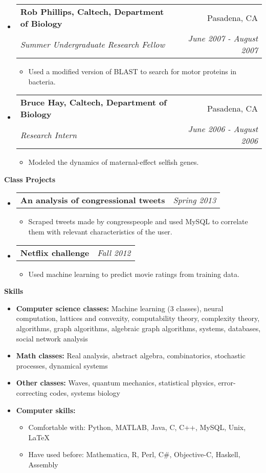 \documentclass[letterpaper,11pt]{article}
\makeatletter
\newcommand{\resitem}[1]{\item #1 \vspace{-2pt}}
\newcommand{\resheading}[1]{{\large \colorbox{mygrey}{\begin{minipage}{\textwidth}{\textbf{#1 \vphantom{p\^{E}}}}\end{minipage}}}}
\newcommand{\ressubheadingnoloc}[4]{
\begin{tabular*}{7.0in}{l@{\extracolsep{\fill}}r}
		\textbf{#1} & \textit{#4} \\
\end{tabular*}\vspace{-6pt}}
\newcommand{\ressubheading}[4]{
\begin{tabular*}{7.0in}{l@{\extracolsep{\fill}}r}
		\textbf{#1} & #2 \\
		\textit{#3} & \textit{#4}\\
\end{tabular*}\vspace{-6pt}}
\makeatother
\begin{document}
\begin{itemize}
\item
	\ressubheading{Rob Phillips, Caltech, Department of Biology}{Pasadena, CA}{Summer Undergraduate Research Fellow}{June 2007 - August 2007}
	\begin{itemize}
		\resitem{Used a modified version of BLAST to search for motor proteins in bacteria.}
	\end{itemize}

\item
	\ressubheading{Bruce Hay, Caltech, Department of Biology}{Pasadena, CA}{Research Intern}{June 2006 - August 2006}
	\begin{itemize}
		\resitem{Modeled the dynamics of maternal-effect selfish genes.}
	\end{itemize}

\end{itemize}

\resheading{Class Projects}
\begin{itemize}
\item
	\ressubheadingnoloc{An analysis of congressional tweets}{Pasadena, CA}{Student}{Spring 2013}
		\begin{itemize}
		\resitem{Scraped tweets made by congresspeople and used MySQL to correlate them with relevant characteristics of the user.}
	\end{itemize}
\item
	\ressubheadingnoloc{Netflix challenge}{Pasadena, CA}{Student}{Fall 2012}
	\begin{itemize}
		\resitem{Used machine learning to predict movie ratings from training data.}
	\end{itemize}
\end{itemize}

\resheading{Skills}
\begin{itemize}
\item \textbf{Computer science classes:} Machine learning (3 classes), neural computation, lattices and convexity, computability theory, complexity theory, algorithms, graph algorithms, algebraic graph algorithms, systems, databases, social network analysis
\item \textbf{Math classes:}  Real analysis, abstract algebra, combinatorics, stochastic processes, dynamical systems
\item \textbf{Other classes:} Waves, quantum mechanics, statistical physics, error-correcting codes, systems biology
\item \textbf{Computer skills:}
	\begin{itemize}
	\item Comfortable with: Python, MATLAB, Java, C, C++, MySQL, Unix, LaTeX
	\item Have used before: Mathematica, R, Perl, C\#, Objective-C, Haskell, Assembly
	\end{itemize}
\end{itemize}
\end{document}
